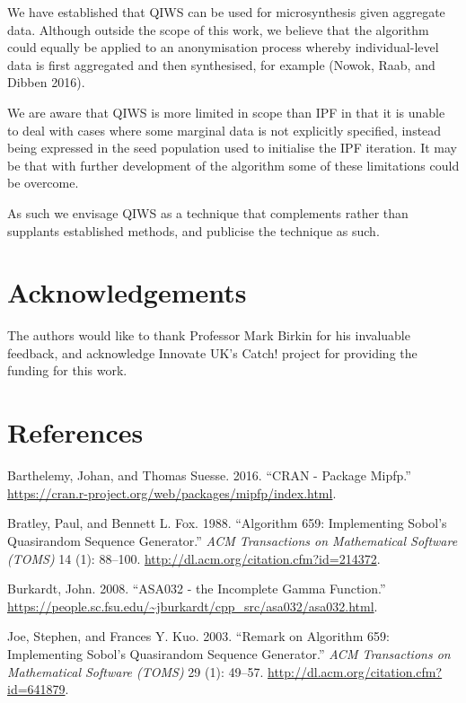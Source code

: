 \documentclass[]{article}
\begin{document}
We have established that QIWS can be used for microsynthesis given
aggregate data. Although outside the scope of this work, we believe that
the algorithm could equally be applied to an anonymisation process
whereby individual-level data is first aggregated and then synthesised,
for example (Nowok, Raab, and Dibben 2016).

We are aware that QIWS is more limited in scope than IPF in that it is
unable to deal with cases where some marginal data is not explicitly
specified, instead being expressed in the seed population used to
initialise the IPF iteration. It may be that with further development of
the algorithm some of these limitations could be overcome.

As such we envisage QIWS as a technique that complements rather than
supplants established methods, and publicise the technique as such.

\section{Acknowledgements}\label{acknowledgements}

The authors would like to thank Professor Mark Birkin for his invaluable
feedback, and acknowledge Innovate UK's Catch! project for providing the
funding for this work.

\section*{References}\label{references}

\hypertarget{refs}{}
\hypertarget{ref-barthelemy_cran_2016}{}
Barthelemy, Johan, and Thomas Suesse. 2016. ``CRAN - Package Mipfp.''
\url{https://cran.r-project.org/web/packages/mipfp/index.html}.

\hypertarget{ref-bratley_algorithm_1988}{}
Bratley, Paul, and Bennett L. Fox. 1988. ``Algorithm 659: Implementing
Sobol's Quasirandom Sequence Generator.'' \emph{ACM Transactions on
Mathematical Software (TOMS)} 14 (1): 88--100.
\url{http://dl.acm.org/citation.cfm?id=214372}.

\hypertarget{ref-burkardt_asa032_2008}{}
Burkardt, John. 2008. ``ASA032 - the Incomplete Gamma Function.''
\url{https://people.sc.fsu.edu/~jburkardt/cpp_src/asa032/asa032.html}.

\hypertarget{ref-joe_remark_2003}{}
Joe, Stephen, and Frances Y. Kuo. 2003. ``Remark on Algorithm 659:
Implementing Sobol's Quasirandom Sequence Generator.'' \emph{ACM
Transactions on Mathematical Software (TOMS)} 29 (1): 49--57.
\url{http://dl.acm.org/citation.cfm?id=641879}.
\end{document}
